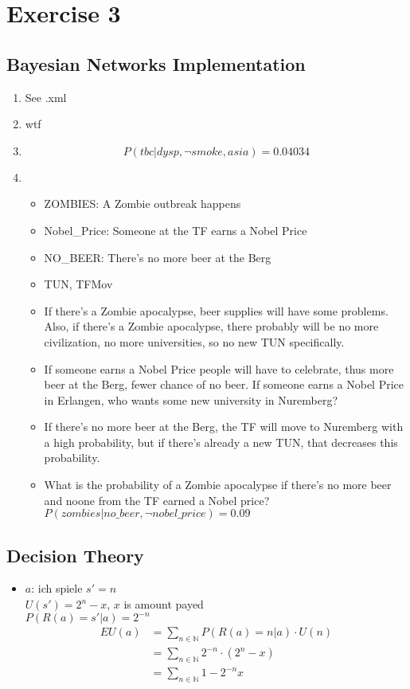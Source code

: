 \documentclass[fleqn,12pt]{scrartcl}
\newcommand{\blattn}{Exercise 3}
\begin{document}
\section*{\blattn}
\setcounter{section}{3}

\subsection{Bayesian Networks Implementation}
\begin{enumerate}
	\item
		See .xml
	\item
		wtf
	\item
		$$P(tbc | dysp, \neg smoke, asia) = 0.04034$$
	\item

		\begin{itemize}
			\item
				ZOMBIES: A Zombie outbreak happens
			\item
				Nobel\_Price: Someone at the TF earns a Nobel Price
			\item
				NO\_BEER: There's no more beer at the Berg
			\item
				TUN, TFMov
			\item
				If there's a Zombie apocalypse, beer supplies will  have some problems. Also, if there's a Zombie apocalypse, there probably will be no more civilization, no more universities, so no new TUN specifically.
			\item
				If someone earns a Nobel Price people will have to celebrate, thus more beer at the Berg, fewer chance of no beer. If someone earns a Nobel Price in Erlangen, who wants some new university in Nuremberg?
			\item
				If there's no more beer at the Berg, the TF will move to Nuremberg with a high probability, but if there's already a new TUN, that decreases this probability.
			\item
				What is the probability of a Zombie apocalypse if there's no more beer and noone from the TF earned a Nobel price? $P(zombies | no\_beer, \neg nobel\_price) =  0.09$

			\end{itemize}

\end{enumerate}

\subsection{Decision Theory}
\begin{itemize}
	\item
		$a$: ich spiele
		$s' = n$\\
		$U(s') = 2^n - x$, $x$ is amount payed\\
		$P(R(a) = s' | a) = 2^{-n}$\\
		\begin{align*}
			EU(a) &= \sum_{n\in \mathbb{N}} P(R(a) = n | a) \cdot U(n)\\
								 &= \sum_{n\in\mathbb{N}} 2^{-n} \cdot (2^n -x)\\
								 &= \sum_{n\in \mathbb{N}} 1 - 2^{-n}x\\
		\end{align*}
\end{itemize}
\end{document}
